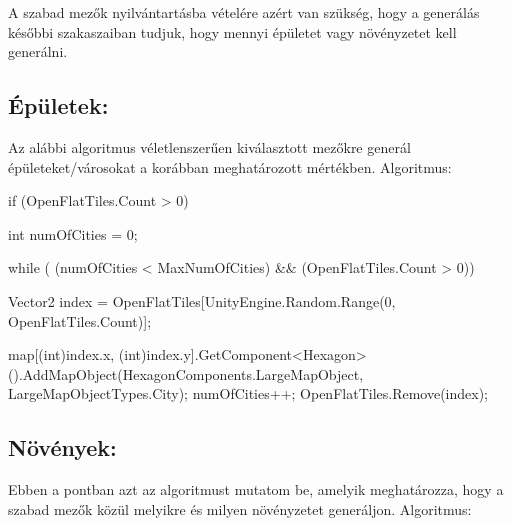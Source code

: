 \noindent A szabad mezők nyilvántartásba vételére azért van szükség, hogy a generálás későbbi szakaszaiban tudjuk, hogy mennyi épületet vagy növényzetet kell generálni.

\subsection{Épületek:}
Az alábbi algoritmus véletlenszerűen kiválasztott mezőkre generál épületeket/városokat a korábban meghatározott mértékben.
\newline
\newline Algoritmus:

\begin{cpp}
if (OpenFlatTiles.Count > 0)
{
   int numOfCities = 0;
    
   while ( (numOfCities < MaxNumOfCities) && (OpenFlatTiles.Count > 0))
   {
      Vector2 index = OpenFlatTiles[UnityEngine.Random.Range(0, 
      OpenFlatTiles.Count)];

      map[(int)index.x, (int)index.y].GetComponent<Hexagon>
      ().AddMapObject(HexagonComponents.LargeMapObject, 
      LargeMapObjectTypes.City);
      numOfCities++;
      OpenFlatTiles.Remove(index);
   }
}
\end{cpp}

\subsection{Növények:}
Ebben a pontban azt az algoritmust mutatom be, amelyik meghatározza, hogy a szabad mezők közül melyikre és milyen növényzetet generáljon.
\newline
\newline Algoritmus:

